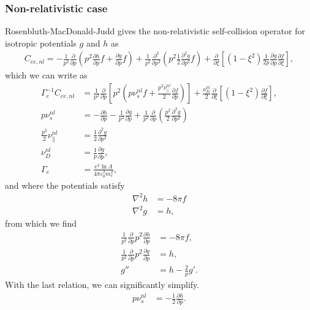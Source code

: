 \documentclass[11pt,a4paper]{article}
\begin{document}
\subsubsection*{Non-relativistic case}
Rosenbluth-MacDonald-Judd gives the non-relativistic self-collision operator for isotropic potentials $g$ and $h$ as
\begin{align}
C_{ee,nl} =  -\frac{1}{p^2}\frac{\partial}{\partial p}\left(p^2\frac{\partial h}{\partial p}f+\frac{\partial g}{\partial p}f\right) + \frac{1}{p^2}\frac{\partial^2}{\partial p^2} \left(p^2\frac{1}{2}\frac{\partial^2 g}{\partial p^2} f\right) +\frac{\partial}{\partial \xi}\left[(1-\xi^2)\frac{1}{2p}\frac{\partial g}{\partial p}\frac{\partial f}{\partial \xi}\right],
\end{align}
which we can write as
\begin{align}
\Gamma_e^{-1}C_{ee,nl} &= \frac{1}{p^2}\frac{\partial}{\partial p}\left[p^2\left( p\nu_s^{nl} f+ \frac{p^2\nu_\parallel^{nl}}{2}\frac{\partial f}{\partial p}\right)\right] + \frac{\nu_D^{nl}}{2}\frac{\partial}{\partial \xi}\left[(1-\xi^2)\frac{\partial f}{\partial\xi}\right], \\
p\nu_s^{nl} &= -\frac{\partial h}{\partial p} - \frac{1}{p^2}\frac{\partial g}{\partial p} +\frac{1}{p^2}\frac{\partial}{\partial p}\left(\frac{p^2}{2}\frac{\partial^2 g}{\partial p^2}\right) \nonumber \\
\frac{p^2}{2}\nu_\parallel^{nl} &= \frac{1}{2}\frac{\partial^2 g}{\partial p^2} \nonumber\\
\nu_D^{nl} &= \frac{1}{p}\frac{\partial g}{\partial p}  \nonumber, \\
\Gamma_e &= \frac{e^4 \ln\Lambda}{4\pi\varepsilon_0^2 m_e^2}, \nonumber
\end{align}
and where the potentials satisfy
\begin{align}
\nabla^2 h &= -8\pi f \nonumber \\
\nabla^2 g &= h,
\end{align}
from which we find
\begin{align}
\frac{1}{p^2}\frac{\partial}{\partial p}p^2\frac{\partial h}{\partial p} &= -8\pi f, \nonumber \\
\frac{1}{p^2}\frac{\partial}{\partial p}p^2\frac{\partial g}{\partial p} &= h , \nonumber \\
g'' &= h-\frac{2}{p}g'.
\end{align}
With the last relation, we can significantly simplify.
\begin{align}
p\nu_s^{nl} &= -\frac{1}{2}\frac{\partial h}{\partial p}.%
\end{align}
\end{document}
